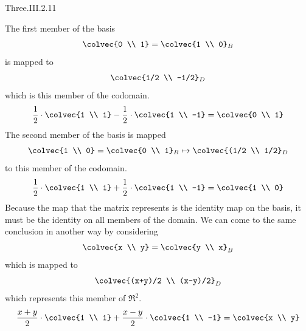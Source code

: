 \begin{ans}{Three.III.2.11}
      \begin{exparts}
        \partsitem The first member of the basis
          \begin{equation*}
            \colvec{0 \\ 1}=\colvec{1 \\ 0}_B
          \end{equation*}
          is mapped to
          \begin{equation*}
            \colvec{1/2 \\ -1/2}_D
          \end{equation*}
          which is this member of the codomain.
          \begin{equation*}
            \frac{1}{2}\cdot\colvec{1 \\ 1}
              -\frac{1}{2}\cdot\colvec{1 \\ -1}
              =\colvec{0 \\ 1}
          \end{equation*}
        \partsitem The second member of the basis is mapped
          \begin{equation*}
            \colvec{1 \\ 0}=\colvec{0 \\ 1}_B
            \mapsto
            \colvec{(1/2 \\ 1/2}_D
          \end{equation*}
          to this member of the codomain.
          \begin{equation*}
            \frac{1}{2}\cdot\colvec{1 \\ 1}
              +\frac{1}{2}\cdot\colvec{1 \\ -1}
              =\colvec{1 \\ 0}
          \end{equation*}
        \partsitem Because the map that the matrix represents is the identity
          map on the basis, it must be the identity on all members of the
          domain.
          We can come to the same conclusion in another way by considering
          \begin{equation*}
            \colvec{x \\ y}=\colvec{y \\ x}_B
          \end{equation*}
          which is mapped to
          \begin{equation*}
            \colvec{(x+y)/2 \\ (x-y)/2}_D
          \end{equation*}
          which represents this member of $\Re^2$.
          \begin{equation*}
            \frac{x+y}{2}\cdot\colvec{1 \\ 1}
              +\frac{x-y}{2}\cdot\colvec{1 \\ -1}
            =\colvec{x \\ y}
          \end{equation*}
      \end{exparts}
    
\end{ans}
